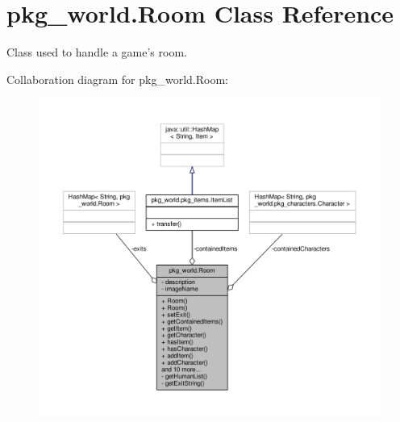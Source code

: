 \hypertarget{classpkg__world_1_1Room}{\section{pkg\-\_\-world.\-Room Class Reference}
\label{classpkg__world_1_1Room}
}


Class used to handle a game's room.  




Collaboration diagram for pkg\-\_\-world.\-Room\-:\nopagebreak
\begin{figure}[H]
\begin{center}
\leavevmode
\includegraphics[width=350pt]{classpkg__world_1_1Room__coll__graph}
\end{center}
\end{figure}
